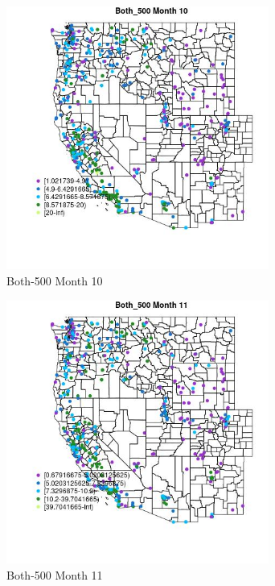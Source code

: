 \begin{figure} 
\centering  
\includegraphics[width=0.77\textwidth]{Code_Outputs/ML_input_report_ML_input_PM25_Step5_part_d_de_duplicated_aves_ML_input_MapObsMo10Both_500.jpg} 
\caption{\label{fig:ML_input_report_ML_input_PM25_Step5_part_d_de_duplicated_aves_ML_inputMapObsMo10Both_500}Both-500 Month 10} 
\end{figure} 
 

\begin{figure} 
\centering  
\includegraphics[width=0.77\textwidth]{Code_Outputs/ML_input_report_ML_input_PM25_Step5_part_d_de_duplicated_aves_ML_input_MapObsMo11Both_500.jpg} 
\caption{\label{fig:ML_input_report_ML_input_PM25_Step5_part_d_de_duplicated_aves_ML_inputMapObsMo11Both_500}Both-500 Month 11} 
\end{figure} 
 


